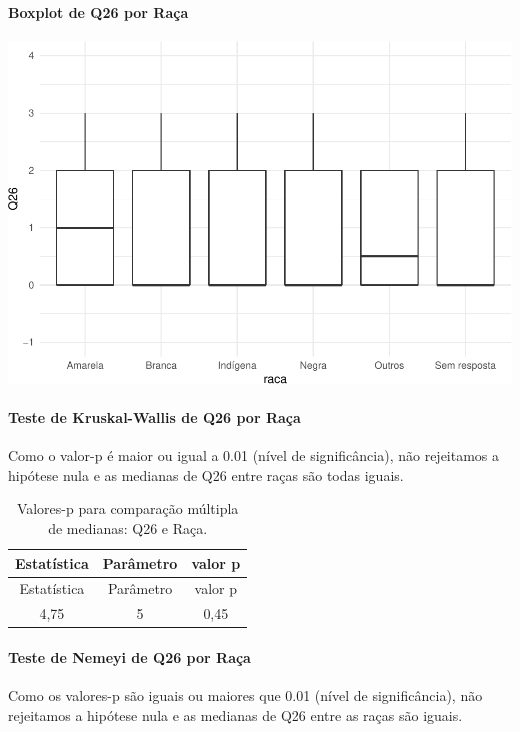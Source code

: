 \documentclass[]{article}
\let\oldparagraph\paragraph
\renewcommand{\paragraph}[1]{\oldparagraph{#1}\mbox{}}
\begin{document}
\hypertarget{boxplot-de-q26-por-rauxe7a}{%
\paragraph{Boxplot de Q26 por Raça}\label{boxplot-de-q26-por-rauxe7a}}

\begin{center}\includegraphics[width=0.75\linewidth]{relatorio_covid19_files/figure-latex/unnamed-chunk-755-1} \end{center}

\hypertarget{teste-de-kruskal-wallis-de-q26-por-rauxe7a}{%
\paragraph{Teste de Kruskal-Wallis de Q26 por Raça}\label{teste-de-kruskal-wallis-de-q26-por-rauxe7a}}

Como o valor-p é maior ou igual a 0.01 (nível de significância), não rejeitamos a hipótese nula e as medianas de Q26 entre raças são todas iguais.

\begin{longtable}[]{@{}ccc@{}}
\caption{\label{tab:unnamed-chunk-757}Valores-p para comparação múltipla de medianas: Q26 e Raça.}\tabularnewline
\toprule
Estatística & Parâmetro & valor p\tabularnewline
\midrule
\endfirsthead
\toprule
Estatística & Parâmetro & valor p\tabularnewline
\midrule
\endhead
4,75 & 5 & 0,45\tabularnewline
\bottomrule
\end{longtable}

\hypertarget{teste-de-nemeyi-de-q26-por-rauxe7a}{%
\paragraph{Teste de Nemeyi de Q26 por Raça}\label{teste-de-nemeyi-de-q26-por-rauxe7a}}

Como os valores-p são iguais ou maiores que 0.01 (nível de significância), não rejeitamos a hipótese nula e as medianas de Q26 entre as raças são iguais.
\end{document}
